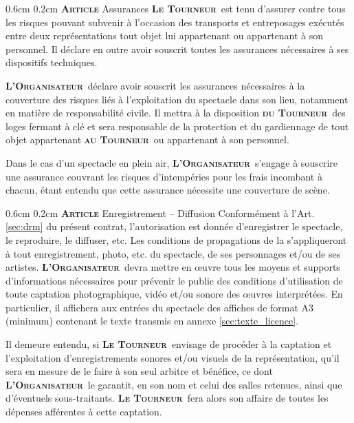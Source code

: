 \documentclass[a4paper,10pt,oneside]{article}
\makeatletter
\newcommand{\PR}{\textbf{\textsc{Le Tourneur}}}
\newcommand{\duPR}{\textbf{\textsc{du Tourneur}}}
\newcommand{\auPR}{\textbf{\textsc{au Tourneur}}}
\newcommand{\OR}{\textbf{\textsc{L'Organisateur}}}
\renewcommand\section{\@startsection{section}{1}{\z@}%
	{0.6cm}%
	{0.2cm}%
	{\noindent\large\bfseries\scshape Article }}
\makeatother
\begin{document}
\section{Assurances}
\label{sec:assurances}
\PR\ est tenu d'assurer contre tous les risques pouvant subvenir \`a
l'occasion des transports et entreposages ex\'ecut\'es entre deux
repr\'esentations tout objet lui appartenant ou appartenant \`a son
personnel. Il d\'eclare en outre avoir souscrit toutes les assurances
n\'ecessaires \`a ses dispositifs techniques.

\OR\ d\'eclare avoir souscrit les assurances n\'ecessaires \`a la couverture
des risques li\'es \`a l'exploitation du spectacle dans son lieu,
notamment en mati\`ere de responsabilit\'e civile. Il mettra \`a la
disposition \duPR\ des loges fermant \`a cl\'e et sera responsable de la
protection et du gardiennage de tout objet appartenant \auPR\ ou
appartenant \`a son personnel.

Dans le cas d'un spectacle en plein air, \OR\ s'engage \`a souscrire une
assurance couvrant les risques d'intemp\'eries pour les frais incombant
\`a chacun, \'etant entendu que cette assurance n\'ecessite une couverture
de sc\`ene.

\section{Enregistrement -- Diffusion}
\label{sec:enregistrement}
Conform\'ement \`a l'Art. \vref{sec:drm} du pr\'esent contrat, l'autorisation
est donn\'ee d'enregistrer le spectacle, le reproduire, le diffuser,
etc. Les conditions de propagations de la \LICENCETYPE{} s'appliqueront
\`a tout enregistrement, photo, etc. du spectacle, de ses personnages
et/ou de ses artistes. \OR\ devra mettre en \oe uvre tous les moyens et
supports d'informations n\'ecessaires pour pr\'evenir le public des
conditions d'utilisation de toute captation photographique, vid\'eo
et/ou sonore des \oe uvres interpr\'et\'ees. En particulier, il affichera
aux entr\'ees du spectacle des affiches de format A3 (minimum) contenant
le texte transmis en annexe \vref{sec:texte_licence}.

Il demeure entendu, si \PR\ envisage de proc\'eder \`a la captation et
l'exploitation d'enregistrements sonores et/ou visuels de la
repr\'esentation, qu'il sera en mesure de le faire \`a son seul arbitre et
b\'en\'efice, ce dont \OR\ le garantit, en son nom et celui des salles
retenues, ainsi que d'\'eventuels sous-traitants. \PR\ fera alors son
affaire de toutes les d\'epenses aff\'erentes \`a cette captation.
\end{document}
